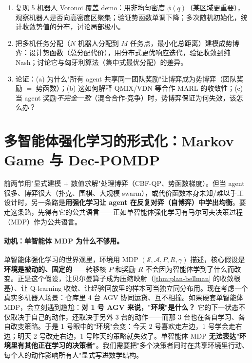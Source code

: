 \begin{practice}
\begin{enumerate}
  \item 复现 5 机器人 Voronoi 覆盖 demo：用非均匀密度 $\phi(q)$（某区域更重要），观察机器人是否向高密度区聚集；验证势函数单调下降；多次随机初始化，统计收敛势值的分布，讨论局部极小。
  \item 把多机任务分配（$N$ 机器人分配到 $M$ 任务点，最小化总距离）建模成势博弈：设计势函数（总分配代价），用分布式更优响应迭代，验证收敛到纯 Nash；讨论它与匈牙利算法（集中式最优分配）的差异。
  \item 论证：(a) 为什么"所有 agent 共享同一团队奖励"让博弈成为势博弈（团队奖励 $=$ 势函数）；(b) 这如何解释 QMIX/VDN 等合作 MARL 的收敛性；(c) 当 agent 奖励\emph{不完全一致}（混合合作-竞争）时，势博弈保证为何失效，该怎么办？
\end{enumerate}
\end{practice}

\section{多智能体强化学习的形式化：Markov Game 与 Dec-POMDP}
\label{sec:sm-marl-form}

前两节用"显式建模 $+$ 数值求解"处理博弈（CBF-QP、势函数梯度）。但当 agent 很多、博弈很大（扑克、围棋、大规模 swarm），或代价函数本身未知/难以手工设计时，另一条路是\textbf{用强化学习让 agent 在反复对弈（自博弈）中学出均衡}。要走这条路，先得有它的公共语言——正如单智能体强化学习有马尔可夫决策过程（MDP）作为公共语言。

\paragraph{动机：单智能体 MDP 为什么不够用。}
单智能体强化学习的世界观里，环境用 MDP $(\mathcal{S},\mathcal{A},P,R,\gamma)$ 描述，核心假设是\textbf{环境是被动的、固定的}——转移核 $P$ 和奖励 $R$ 不会因为智能体学到了什么而改变。正是这个假设，让贝尔曼算子成为压缩映射（\cref{thm:plan-bellman} 的收敛根基）、让 Q-learning 收敛、让经验回放里的样本可当独立同分布用。现在考虑一个真实多机器人场景：仓库里 4 台 AGV 协同运货、互不相撞。如果硬套单智能体 MDP，会立刻遇到尴尬：\textbf{对 1 号 AGV 来说，"环境"是什么？} 它的下一状态不仅取决于自己的动作，还取决于另外 3 台的动作——而那 3 台也在各自学习、各自改变策略。于是 1 号眼中的"环境"会变：今天 2 号喜欢走左边，1 号学会走右边；明天 2 号改走右边，1 号昨天的策略就失效了。单智能体 MDP \textbf{无法表达"环境里有其他正在学习的决策者"}。我们需要把"多个决策者同时在共享环境里行动、每个人的动作影响所有人"显式写进数学结构。

